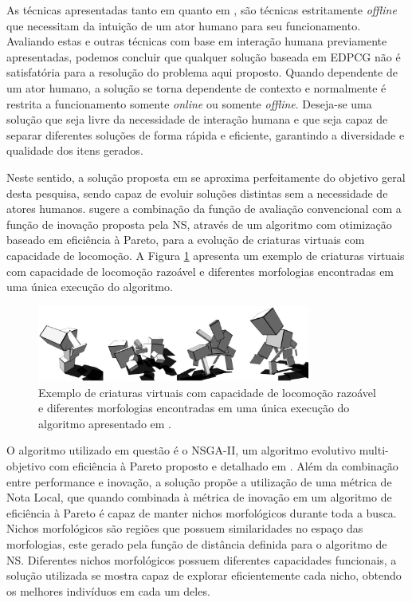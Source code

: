 As técnicas apresentadas tanto em \cite{liapis2013sentient} quanto em \cite{woolley2014novel}, são técnicas estritamente \emph{offline} que necessitam da intuição de um ator humano para seu funcionamento. Avaliando estas e outras técnicas com base em interação humana previamente apresentadas, podemos concluir que qualquer solução baseada em EDPCG não é satisfatória para a resolução do problema aqui proposto. Quando dependente de um ator humano, a solução se torna dependente de contexto e normalmente é restrita a funcionamento somente \emph{online} ou somente \emph{offline}. Deseja-se uma solução que seja livre da necessidade de interação humana e que seja capaz de separar diferentes soluções de forma rápida e eficiente, garantindo a diversidade e qualidade dos itens gerados.

Neste sentido, a solução proposta em \cite{lehman2011evolving} se aproxima perfeitamente do objetivo geral desta pesquisa, sendo capaz de evoluir soluções distintas sem a necessidade de atores humanos. \cite{lehman2011evolving} sugere a combinação da função de avaliação convencional com a função de inovação proposta pela NS, através de um algoritmo com otimização baseado em eficiência à Pareto, para a evolução de criaturas virtuais com capacidade de locomoção. A Figura \ref{fig:lehman2011evolving} apresenta um exemplo de criaturas virtuais com capacidade de locomoção razoável e diferentes morfologias encontradas em uma única execução do algoritmo.

\begin{figure}[htb]
	\begin{center}
		\includegraphics[width=0.8\textwidth]{Imagens/lehman2011evolving.jpg}
		\caption{Exemplo de criaturas virtuais com capacidade de locomoção razoável e diferentes morfologias encontradas em uma única execução do algoritmo apresentado em \cite{lehman2011evolving}.}
		\label{fig:lehman2011evolving}
	\end{center}
\end{figure}

O algoritmo utilizado em questão é o NSGA-II, um algoritmo evolutivo multi-objetivo com eficiência à Pareto proposto e detalhado em \cite{deb2002fast}. Além da combinação entre performance e inovação, a solução propõe a utilização de uma métrica de Nota Local, que quando combinada à métrica de inovação em um algoritmo de eficiência à Pareto é capaz de manter nichos morfológicos durante toda a busca. Nichos morfológicos são regiões que possuem similaridades no espaço das morfologias, este gerado pela função de distância definida para o algoritmo de NS. Diferentes nichos morfológicos possuem diferentes capacidades funcionais, a solução utilizada se mostra capaz de explorar eficientemente cada nicho, obtendo os melhores indivíduos em cada um deles.

